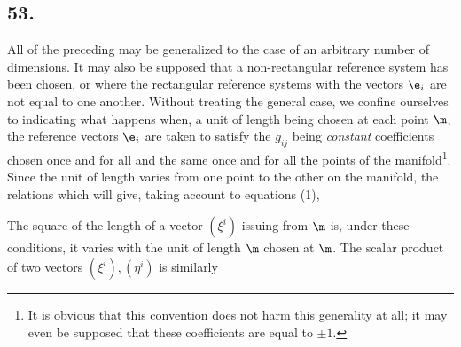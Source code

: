 \subsection*{53.}

All of the preceding may be generalized to the case of an arbitrary number of dimensions. It may also be supposed that a non-rectangular reference system has been chosen, or where the rectangular reference systems with the vectors $\e_i$ are not equal to one another. Without treating the general case, we confine ourselves to indicating what happens when, a unit of length being chosen at each point $\m$, the reference vectors $\e_i$ are taken to satisfy
the $g_{ij}$ being \textit{constant} coefficients chosen once and for all and the same once and for all the points of the manifold\footnote{It is obvious that this convention does not harm this generality at all; it may even be supposed that these coefficients are equal to $\pm 1$.}. Since the unit of length varies from one point to the other on the manifold,  the relations
which will give, taking account to equations (1),

The square of the length of a vector $(\xi^i)$ issuing from $\m$ is, under these conditions,
it varies with the unit of length $\m$ chosen at $\m$. The scalar product of two vectors $(\xi^i), (\eta^i)$ is similarly
